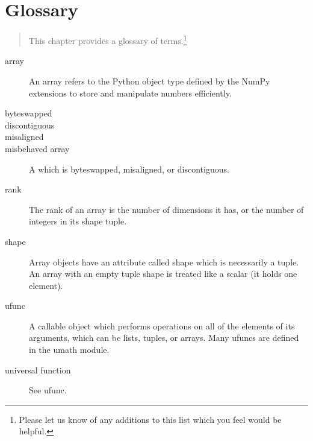 \chapter{Glossary}
\label{cha:glossary}

\begin{quote} 
   This chapter provides a glossary of terms.\footnote{Please let us know of
      any additions to this list which you feel would be helpful.}
\end{quote}

\begin{description}
\item[array] An array refers to the Python object type defined by the NumPy
   extensions to store and manipulate numbers efficiently.
\item[byteswapped]
\item[discontiguous]  
\item[misaligned] 
\item[misbehaved array] A \class{\numarray} which is byteswapped, misaligned,
   or discontiguous.
\item[rank] The rank of an array is the number of dimensions it has, or the
   number of integers in its shape tuple.
\item[shape] Array objects have an attribute called shape which is necessarily
   a tuple. An array with an empty tuple shape is treated like a scalar (it
   holds one element).
\item[ufunc] A callable object which performs operations on all of the elements
   of its arguments, which can be lists, tuples, or arrays. Many ufuncs are
   defined in the umath module.
\item[universal function] See ufunc.
\end{description}
 


